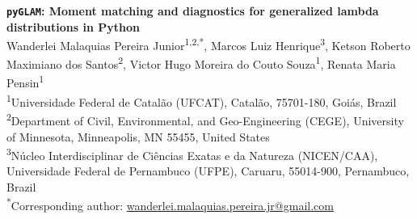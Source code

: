 \begin{center}
{\Large\bfseries \texttt{pyGLAM}: Moment matching and diagnostics for
generalized lambda distributions in Python}
\\[2ex]

{\small
  Wanderlei Malaquias Pereira Junior\textsuperscript{1,2,*}\orcidlink{},
  Marcos Luiz Henrique\textsuperscript{3}\orcidlink{},
  Ketson Roberto Maximiano dos Santos\textsuperscript{2}\orcidlink{},
  Victor Hugo Moreira do Couto Souza\textsuperscript{1}\orcidlink{},
  Renata Maria Pensin\textsuperscript{1}\orcidlink{}
}
\\[1ex]

{\footnotesize
  \textsuperscript{1}Universidade Federal de Catal\~ao (UFCAT), Catal\~ao,
  75701-180, Goi\'as, Brazil \\[0.3ex]
  \textsuperscript{2}Department of Civil, Environmental, and Geo-Engineering
  (CEGE), University of Minnesota, Minneapolis, MN 55455, United States \\[0.3ex]
  \textsuperscript{3}N\'ucleo Interdisciplinar de Ci\^encias Exatas e da
  Natureza (NICEN/CAA), Universidade Federal de Pernambuco (UFPE), Caruaru,
  55014-900, Pernambuco, Brazil
}
\\[0.8ex]

{\footnotesize \textsuperscript{*}Corresponding author:
\href{mailto:wanderlei.malaquias.pereira.jr@gmail.com}{wanderlei.malaquias.pereira.jr@gmail.com}}
\end{center}
